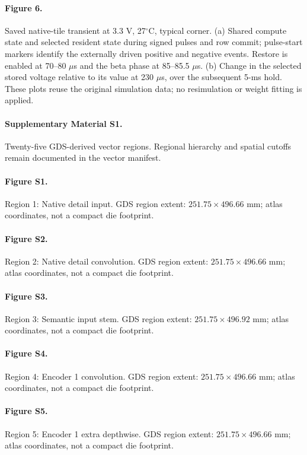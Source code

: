 \paragraph{Figure 6.} Saved native-tile transient at 3.3 V, 27$^\circ$C, typical corner. (a) Shared compute state and selected resident state during signed pulses and row commit; pulse-start markers identify the externally driven positive and negative events. Restore is enabled at 70--80 $\mu$s and the beta phase at 85--85.5 $\mu$s. (b) Change in the selected stored voltage relative to its value at 230 $\mu$s, over the subsequent 5-ms hold. These plots reuse the original simulation data; no resimulation or weight fitting is applied.

\paragraph{Supplementary Material S1.} Twenty-five GDS-derived vector regions. Regional hierarchy and spatial cutoffs remain documented in the vector manifest.

\paragraph{Figure S1.} Region 1: Native detail input. GDS region extent: $251.75\times496.66$ mm; atlas coordinates, not a compact die footprint.

\paragraph{Figure S2.} Region 2: Native detail convolution. GDS region extent: $251.75\times496.66$ mm; atlas coordinates, not a compact die footprint.

\paragraph{Figure S3.} Region 3: Semantic input stem. GDS region extent: $251.75\times496.92$ mm; atlas coordinates, not a compact die footprint.

\paragraph{Figure S4.} Region 4: Encoder 1 convolution. GDS region extent: $251.75\times496.66$ mm; atlas coordinates, not a compact die footprint.

\paragraph{Figure S5.} Region 5: Encoder 1 extra depthwise. GDS region extent: $251.75\times496.66$ mm; atlas coordinates, not a compact die footprint.

